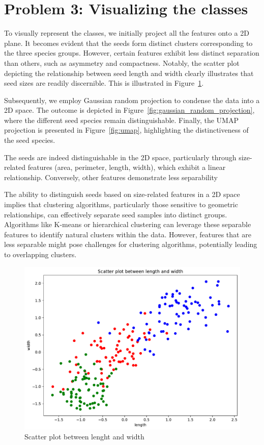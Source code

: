 \documentclass[a4paper]{article}
\begin{document}
\section*{Problem 3: Visualizing the classes}


To visually represent the classes, we initially project all the features onto a 2D plane. 
It becomes evident that the seeds form distinct clusters corresponding to the three species groups. 
However, certain features exhibit less distinct separation than others, such as asymmetry and compactness. 
Notably, the scatter plot depicting the relationship between seed length and width clearly illustrates that seed sizes are readily discernible. 
This is illustrated in Figure~\ref{fig:feature}.

Subsequently, we employ Gaussian random projection to condense the data into a 2D space. 
The outcome is depicted in Figure~\ref{fig:gaussian_random_projection}, where the different seed species remain distinguishable.
 Finally, the UMAP projection is presented in Figure~\ref{fig:umap}, highlighting the distinctiveness of the seed species.

The seeds are indeed distinguishable in the 2D space, particularly through size-related features (area, perimeter, length, width), 
which exhibit a linear relationship. Conversely, other features demonstrate less separability

The ability to distinguish seeds based on size-related features in a 2D space implies that clustering algorithms, 
particularly those sensitive to geometric relationships, can effectively separate seed samples into distinct groups. 
Algorithms like K-means or hierarchical clustering can leverage these separable features to identify natural clusters within the data. 
However, features that are less separable might pose challenges for clustering algorithms, potentially leading to overlapping clusters. 

\begin{figure}[H]
  \begin{center}
    \includegraphics[width=\textwidth]{ola/feature.pdf}
    \caption{Scatter plot between lenght and width}
    \label{fig:feature}
  \end{center}
\end{figure}
\end{document}
